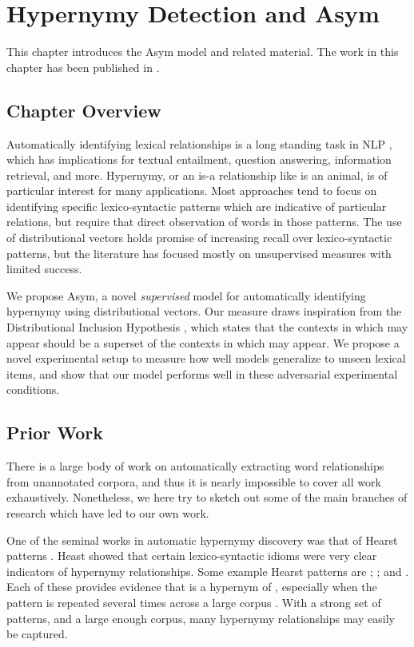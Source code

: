 \chapter{Hypernymy Detection and Asym}\label{ch:lexmem}

This chapter introduces the Asym model and related material. The work
in this chapter has been published in .

\section{Chapter Overview}

Automatically identifying lexical relationships is a long standing task
in NLP \cite{hearst:1992:coling,snow:2004:nips,girju:2006:cl}, which has
implications for textual entailment, question answering, information
retrieval, and more. Hypernymy, or an is-a relationship like  is an
animal, is of particular interest for many applications. Most approaches tend
to focus on identifying specific lexico-syntactic patterns which are indicative
of particular relations, but require that direct observation of words in
those patterns. The use of distributional vectors holds promise of increasing
recall over lexico-syntactic patterns, but the literature has focused mostly
on unsupervised measures with limited success.

We propose Asym, a novel {\em supervised} model for automatically identifying
hypernymy using distributional vectors. Our measure draws inspiration from
the Distributional Inclusion Hypothesis \cite{zhitomirskygeffet:2005:acl},
which states that the contexts in which  may appear should be a
superset of the contexts in which  may appear. We propose a novel
experimental setup to measure how well models generalize to unseen lexical
items, and show that our model performs well in these adversarial experimental
conditions.

\section{Prior Work}

There is a large body of work on automatically extracting word relationships
from unannotated corpora, and thus it is nearly impossible to cover all work
exhaustively. Nonetheless, we here try to sketch out some of the main branches
of research which have led to our own work.

One of the seminal works in automatic hypernymy discovery was that of Hearst
patterns \cite{hearst:1992:coling}. Heast showed that certain lexico-syntactic
idioms were very clear indicators of hypernymy relationships. Some example
Hearst patterns are ; ;
and . Each of these provides evidence that  is a
hypernym of , especially when the pattern is repeated several times across a
large corpus \cite{hearst:1992:coling}. With a strong set of patterns, and a
large enough corpus, many hypernymy relationships may easily be captured.

